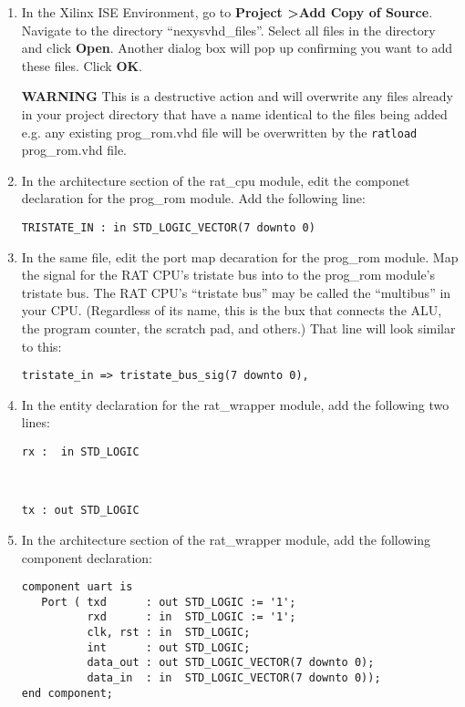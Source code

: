 \documentclass[notitlepage]{article}
\newcommand{\warningsign}{\fontencoding{U}\fontfamily{futs}\selectfont\char 66\relax}
\begin{document}
\begin{enumerate}
\item In the Xilinx ISE Environment, go to \textbf{Project \textgreater Add Copy of Source}. Navigate to the directory ``nexys\textunderscore vhd\_files''. Select all files in the directory and click \textbf{Open}. Another dialog box will pop up confirming you want to add these files. Click \textbf{OK}.

\begin{infobox}
\textbf{{\warningsign} WARNING} This is a destructive action and will overwrite any files already in your project directory that have a name identical to the files being added e.g. any existing prog\_rom.vhd file will be overwritten by the \texttt{ratload} prog\_rom.vhd file.
\end{infobox}

\item In the architecture section of the rat\_cpu module, edit the componet declaration for the prog\_rom module. Add the following line:\\
\centerline{\texttt{TRISTATE\_IN : in STD\_LOGIC\_VECTOR(7 downto 0)}}

\item In the same file, edit the port map decaration for the prog\_rom module. Map the signal for the RAT CPU's tristate bus into to the prog\_rom module's tristate bus. The RAT CPU's ``tristate bus'' may be called the ``multibus'' in your CPU. (Regardless of its name, this is the bux that connects the ALU, the program counter, the scratch pad, and others.) That line will look similar to this:\\
\centerline{\texttt{tristate\_in =\textgreater ~tristate\_bus\_sig(7 downto 0),}}

\item In the entity declaration for the rat\_wrapper module, add the following two lines:\\
\centerline{\texttt{rx : ~in STD\_LOGIC}}\\
\centerline{\texttt{tx : out STD\_LOGIC}}

\item In the architecture section of the rat\_wrapper module, add the following component declaration:
\begin{verbatim}
component uart is
   Port ( txd      : out STD_LOGIC := '1';
          rxd      : in  STD_LOGIC := '1';
          clk, rst : in  STD_LOGIC;
          int      : out STD_LOGIC;
          data_out : out STD_LOGIC_VECTOR(7 downto 0);
          data_in  : in  STD_LOGIC_VECTOR(7 downto 0));
end component;
\end{verbatim}


\end{enumerate}
\end{document}

